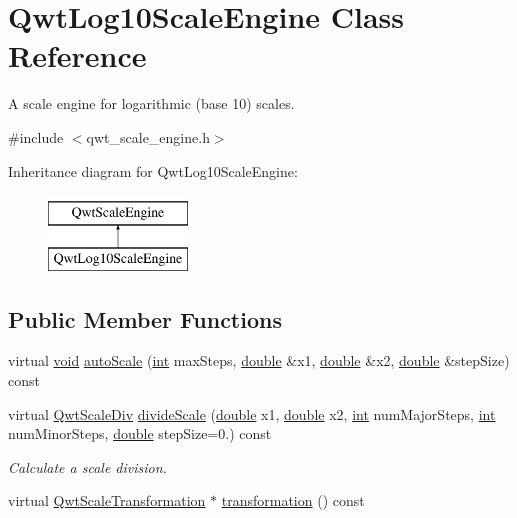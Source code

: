 \hypertarget{class_qwt_log10_scale_engine}{\section{Qwt\-Log10\-Scale\-Engine Class Reference}
\label{class_qwt_log10_scale_engine}
}


A scale engine for logarithmic (base 10) scales.  




{\ttfamily \#include $<$qwt\-\_\-scale\-\_\-engine.\-h$>$}

Inheritance diagram for Qwt\-Log10\-Scale\-Engine\-:\begin{figure}[H]
\begin{center}
\leavevmode
\includegraphics[height=2.000000cm]{class_qwt_log10_scale_engine}
\end{center}
\end{figure}
\subsection*{Public Member Functions}
\begin{DoxyCompactItemize}
\item 
virtual \hyperlink{group___u_a_v_objects_plugin_ga444cf2ff3f0ecbe028adce838d373f5c}{void} \hyperlink{class_qwt_log10_scale_engine_abcab6bb8667f82dcdb656ad634976142}{auto\-Scale} (\hyperlink{ioapi_8h_a787fa3cf048117ba7123753c1e74fcd6}{int} max\-Steps, \hyperlink{_super_l_u_support_8h_a8956b2b9f49bf918deed98379d159ca7}{double} \&x1, \hyperlink{_super_l_u_support_8h_a8956b2b9f49bf918deed98379d159ca7}{double} \&x2, \hyperlink{_super_l_u_support_8h_a8956b2b9f49bf918deed98379d159ca7}{double} \&step\-Size) const 
\item 
virtual \hyperlink{class_qwt_scale_div}{Qwt\-Scale\-Div} \hyperlink{class_qwt_log10_scale_engine_ae46745d561ce2ac583bb44e94f0fc7d6}{divide\-Scale} (\hyperlink{_super_l_u_support_8h_a8956b2b9f49bf918deed98379d159ca7}{double} x1, \hyperlink{_super_l_u_support_8h_a8956b2b9f49bf918deed98379d159ca7}{double} x2, \hyperlink{ioapi_8h_a787fa3cf048117ba7123753c1e74fcd6}{int} num\-Major\-Steps, \hyperlink{ioapi_8h_a787fa3cf048117ba7123753c1e74fcd6}{int} num\-Minor\-Steps, \hyperlink{_super_l_u_support_8h_a8956b2b9f49bf918deed98379d159ca7}{double} step\-Size=0.) const 
\begin{DoxyCompactList}\small\item\em Calculate a scale division. \end{DoxyCompactList}\item 
virtual \hyperlink{class_qwt_scale_transformation}{Qwt\-Scale\-Transformation} $\ast$ \hyperlink{class_qwt_log10_scale_engine_af972778615ea076c8452abea96516ce9}{transformation} () const 
\end{DoxyCompactItemize}

